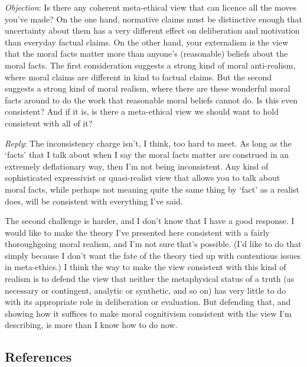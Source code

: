 \documentclass[
  11pt,
  letterpaper,
  DIV=11,
  numbers=noendperiod,
  twoside]{scrartcl}
\begin{document}
\emph{Objection}: Is there any coherent meta-ethical view that can
licence all the moves you've made? On the one hand, normative claims
must be distinctive enough that uncertainty about them has a very
different effect on deliberation and motivation than everyday factual
claims. On the other hand, your externalism is the view that the moral
facts matter more than anyone's (reasonable) beliefs about the moral
facts. The first consideration suggests a strong kind of moral
anti-realism, where moral claims are different in kind to factual
claims. But the second suggests a strong kind of moral realism, where
there are these wonderful moral facts around to do the work that
reasonable moral beliefs cannot do. Is this even consistent? And if it
is, is there a meta-ethical view we should want to hold consistent with
all of it?

\emph{Reply}: The inconsistency charge isn't, I think, too hard to meet.
As long as the `facts' that I talk about when I say the moral facts
matter are construed in an extremely deflationary way, then I'm not
being inconsistent. Any kind of sophisticated expressivist or
quasi-realist view that allows you to talk about moral facts, while
perhaps not meaning quite the same thing by `fact' as a realist does,
will be consistent with everything I've said.

The second challenge is harder, and I don't know that I have a good
response. I would like to make the theory I've presented here consistent
with a fairly thoroughgoing moral realism, and I'm not sure that's
possible. (I'd like to do that simply because I don't want the fate of
the theory tied up with contentious issues in meta-ethics.) I think the
way to make the view consistent with this kind of realism is to defend
the view that neither the metaphysical status of a truth (as necessary
or contingent, analytic or synthetic, and so on) has very little to do
with its appropriate role in deliberation or evaluation. But defending
that, and showing how it suffices to make moral cognitivism consistent
with the view I'm describing, is more than I know how to do now.

\subsection*{References}\label{references}
\end{document}

